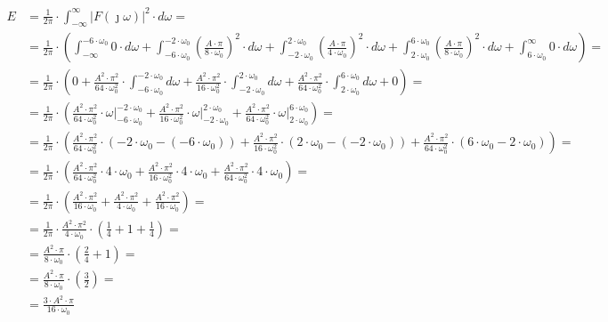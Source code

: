 \begin{task}
\begin{align*}
E &= \frac{1}{2\pi} \cdot \int_{-\infty}^{\infty} \left|F(\jmath \omega)\right|^2 \cdot d\omega=\\
&=\frac{1}{2\pi} \cdot \left(\int_{-\infty}^{-6 \cdot \omega_0} 0 \cdot d\omega + \int_{-6 \cdot \omega_0}^{-2 \cdot \omega_0} \left(\frac{A \cdot \pi}{8 \cdot \omega_0}\right)^2 \cdot d\omega + \int_{-2 \cdot \omega_0}^{2 \cdot \omega_0} \left(\frac{A \cdot \pi}{4 \cdot \omega_0}\right)^2 \cdot d\omega + \int_{2 \cdot \omega_0}^{6 \cdot \omega_0} \left(\frac{A \cdot \pi}{8 \cdot \omega_0}\right)^2 \cdot d\omega + \int_{6 \cdot \omega_0}^{\infty} 0 \cdot d\omega\right)=\\
&=\frac{1}{2\pi} \cdot \left( 0 + \frac{A^2 \cdot \pi^2}{64 \cdot \omega_0^2} \cdot \int_{-6 \cdot \omega_0}^{-2 \cdot \omega_0} d\omega + \frac{A^2 \cdot \pi^2}{16 \cdot \omega_0^2} \cdot \int_{-2 \cdot \omega_0}^{2 \cdot \omega_0} d\omega + \frac{A^2 \cdot \pi^2}{64 \cdot \omega_0^2} \cdot \int_{2 \cdot \omega_0}^{6 \cdot \omega_0} d\omega + 0\right)=\\
&=\frac{1}{2\pi} \cdot \left(\frac{A^2 \cdot \pi^2}{64 \cdot \omega_0^2} \cdot \left.\omega \right|_{-6 \cdot \omega_0}^{-2 \cdot \omega_0} + \frac{A^2 \cdot \pi^2}{16 \cdot \omega_0^2} \cdot \left.\omega \right|_{-2 \cdot \omega_0}^{2 \cdot \omega_0} + \frac{A^2 \cdot \pi^2}{64 \cdot \omega_0^2} \cdot \left.\omega \right|_{2 \cdot \omega_0}^{6 \cdot \omega_0}\right)=\\
&=\frac{1}{2\pi} \cdot \left(\frac{A^2 \cdot \pi^2}{64 \cdot \omega_0^2} \cdot (-2 \cdot \omega_0-(-6 \cdot \omega_0)) + \frac{A^2 \cdot \pi^2}{16 \cdot \omega_0^2} \cdot (2 \cdot \omega_0 -(-2 \cdot \omega_0)) + \frac{A^2 \cdot \pi^2}{64 \cdot \omega_0^2} \cdot (6 \cdot \omega_0 - 2 \cdot \omega_0)\right)=\\
&=\frac{1}{2\pi} \cdot \left(\frac{A^2 \cdot \pi^2}{64 \cdot \omega_0^2} \cdot 4 \cdot \omega_0 + \frac{A^2 \cdot \pi^2}{16 \cdot \omega_0^2} \cdot 4 \cdot \omega_0  + \frac{A^2 \cdot \pi^2}{64 \cdot \omega_0^2} \cdot 4 \cdot \omega_0\right)=\\
&=\frac{1}{2\pi} \cdot \left(\frac{A^2 \cdot \pi^2}{16 \cdot \omega_0} + \frac{A^2 \cdot \pi^2}{4 \cdot \omega_0} + \frac{A^2 \cdot \pi^2}{16 \cdot \omega_0}\right)=\\
&=\frac{1}{2\pi} \cdot \frac{A^2 \cdot \pi^2}{4 \cdot \omega_0} \cdot \left(\frac{1}{4} + 1 + \frac{1}{4}\right)=\\
&=\frac{A^2 \cdot \pi}{8 \cdot \omega_0} \cdot \left(\frac{2}{4} + 1\right)=\\
&=\frac{A^2 \cdot \pi}{8 \cdot \omega_0} \cdot \left(\frac{3}{2}\right)=\\
&=\frac{3 \cdot A^2 \cdot \pi}{16 \cdot \omega_0}
\end{align*}


\end{task}

